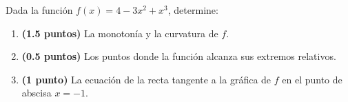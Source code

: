 
Dada la función $f(x)=4-3x^2+x^3$, determine:
\begin{enumerate}[label=\alph*)]
\item \textbf{(1.5 puntos)} La monotonía y la curvatura de $f$.
\item \textbf{(0.5 puntos)} Los puntos donde la función alcanza sus extremos relativos.
\item \textbf{(1 punto)} La ecuación de la recta tangente a la gráfica de $f$ en el punto de abscisa $x=-1$.
\end{enumerate}
